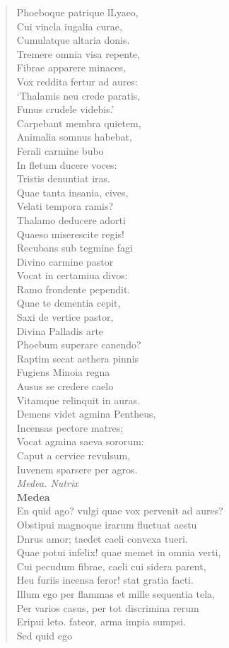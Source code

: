 \documentclass[11pt, a4paper]{report}
\begin{document}
\begin{verse}
{Phoeboque patrique lLyaeo, \\ Cui vincla iugalia curae, \\ Cumulatque altaria donis. \\ Tremere omnia visa repente, \\ Fibrae apparere minaces, \\ Vox reddita fertur ad aures: \\ ‘Thalamis neu crede paratis, \\ Funus crudele videbis.’ \\ Carpebant membra quietem, \\ Animalia somnus habebat, \\ Ferali carmine bubo \\ In fletum ducere voces: \\ Tristis denuntiat iras. \\ Quae tanta insania, cives, \\ Velati tempora ramis? \\ Thalamo deducere adorti \\ Quaeso miserescite regis! \\ Recubans sub tegmine fagi \\ Divino carmine pastor \\ Vocat in certamiua divos: \\ Ramo frondente pependit. \\ Quae te dementia cepit, \\ Saxi de vertice pastor, \\ Divina Palladis arte \\ Phoebum superare canendo? \\ Raptim secat aethera pinnis \\ Fugiens Minoia regna \\ Ausus se credere caelo \\ Vitamque relinquit in auras. \\ Demens videt agmina Pentheus, \\ Incensas pectore matres; \\ Vocat agmina saeva sororum: \\ Caput a cervice revulsum, \\ Iuvenem sparsere per agros. \\ \textit{Medea. Nutrix} \\ \textbf{Medea} \\En quid ago? vulgi quae vox pervenit ad aures? \\ Obstipui magnoque irarum fluctuat aestu \\ Dnrus amor; taedet caeli convexa tueri. \\ Quae potui infelix! quae memet in omnia verti, \\ Cui pecudum fibrae, caeli cui sidera parent, \\ Heu furiis incensa feror! stat gratia facti. \\ Illum ego per flammas et mille sequentia tela, \\ Per varios casus, per tot discrimina rerum \\ Eripui leto. fateor, arma impia sumpsi. \\ Sed quid ego }
\end{verse}
\end{document}
